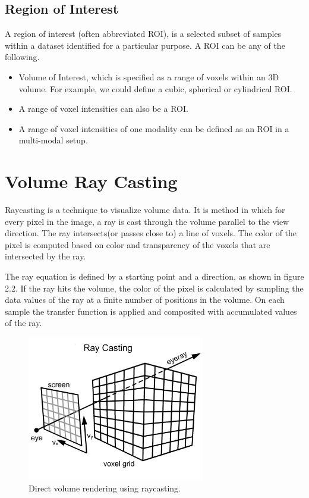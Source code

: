 \subsection{Region of Interest}
A region of interest (often abbreviated ROI), is a selected subset of samples within a dataset identified for a particular purpose. A ROI can be any of the following.

\begin{itemize}
\item Volume of Interest, which is specified as a range of voxels within an 3D volume. For example, we could define a cubic, spherical or cylindrical ROI. 
\item A range of voxel intensities can also be a ROI.
\item A range of voxel intensities of one modality can be defined as an ROI in a multi-modal setup. 
\end{itemize}

\section{Volume Ray Casting}

Raycasting is a technique to visualize volume data. It is method in which for every pixel in the image, a ray is cast through the volume parallel to the view direction. The ray intersects(or passes close to) a line of voxels. The color of the pixel is computed based on color and transparency of the voxels that are intersected by the ray.

The ray equation is defined by a starting point and a direction, as shown in figure 2.2. If the ray hits the volume, the color of the pixel is calculated by sampling the data values of the ray at a finite number of positions in the volume. On each sample the transfer function is applied and composited with accumulated values of the ray.

\begin{figure}
\centering
\includegraphics[width=220pt]{Images/ray_cast1.jpg}
\caption{\label{fig:ray_cast1.jpg} Direct volume rendering using raycasting.}
\end{figure}


